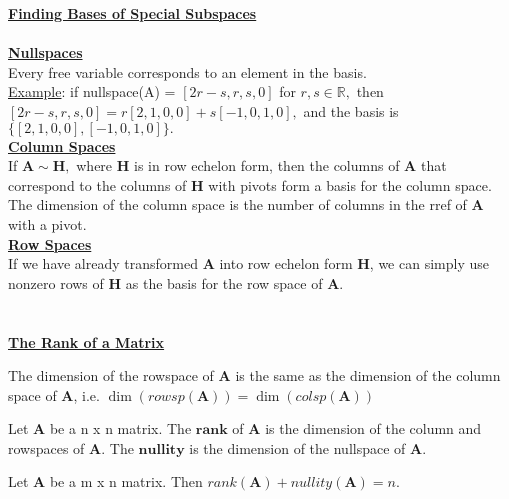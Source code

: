 \documentclass{article}
\begin{document}
\newpage
\textbf{\underline{Finding Bases of Special Subspaces}} \\ \\
\textbf{\underline{Nullspaces}} \\
Every free variable corresponds to an element in the basis. \\
\underline{Example}: if nullspace(A) = $[2r-s, r, s, 0]$ for $r, s \in \mathbb{R},$ then $[2r-s, r, s, 0] = r[2, 1, 0, 0] + s[-1, 0, 1, 0],$ and the basis is $\{[2, 1, 0, 0], [-1, 0, 1, 0]\}.$ \\

\textbf{\underline{Column Spaces}} \\
If $\boldsymbol{A} \sim \boldsymbol{H},$ where $\boldsymbol{H}$ is in row echelon form, then the columns of $\boldsymbol{A}$ that correspond to the columns of $\boldsymbol{H}$ with pivots form a basis for the column space.\\ The dimension of the column space is the number of columns in the rref of $\boldsymbol{A}$ with a pivot. \\

\textbf{\underline{Row Spaces}} \\
If we have already transformed $\boldsymbol{A}$ into row echelon form $\boldsymbol{H}$, we can simply use nonzero rows of $\boldsymbol{H}$ as the basis for the row space of $\boldsymbol{A}.$ \\ \\ \\ 

\textbf{\underline{The Rank of a Matrix}} 
\begin{theorem}
The dimension of the rowspace of $\boldsymbol{A}$ is the same as the dimension of the column space of $\boldsymbol{A}$, i.e. $\dim(rowsp(\boldsymbol{A})) = \dim(colsp(\boldsymbol{A}))$
\end{theorem}

\begin{definition}
Let $\boldsymbol{A}$ be a n x n matrix. The $\textbf{rank}$ of $\boldsymbol{A}$ is the dimension of the column and rowspaces of $\boldsymbol{A}.$ The $\textbf{nullity}$ is the dimension of the nullspace of $\boldsymbol{A}.$
\end{definition}

\begin{theorem}
Let $\boldsymbol{A}$ be a m x n matrix. Then $rank(\boldsymbol{A}) + nullity(\boldsymbol{A}) = n.$ \\ \\ \\
\end{theorem}
\end{document}
